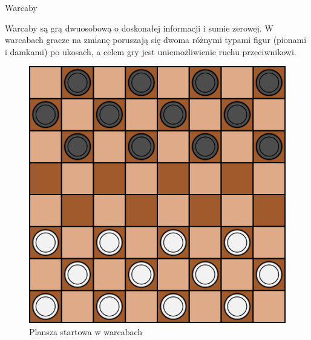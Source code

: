 \begin{frame}{Warcaby}

	Warcaby są grą dwuosobową o doskonałej informacji i sumie zerowej.
	W warcabach gracze na zmianę poruszają się dwoma różnymi typami figur (pionami i damkami) po ukosach, a celem gry jest uniemożliwienie ruchu przeciwnikowi.

	\begin{figure}
		\includegraphics[scale=.4]{figures/warcaby_planszaStartowa.png}
		\caption{Plansza startowa w warcabach}
	\end{figure}

\end{frame}
